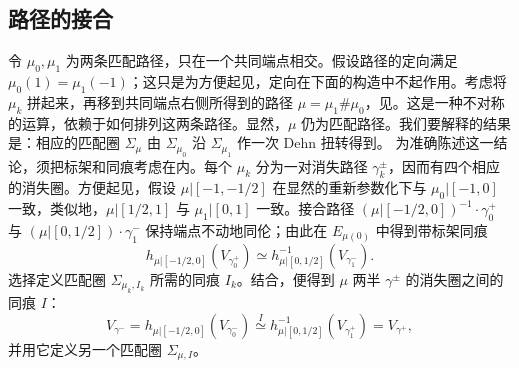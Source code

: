 \subsection{路径的接合}\label{sec:16h}
令 $\mu_0,\mu_1$ 为两条匹配路径，只在一个共同端点相交。假设路径的定向满足 $\mu_0(1)=\mu_1(-1)$；这只是为方便起见，定向在下面的构造中不起作用。考虑将 $\mu_k$ 拼起来，再移到共同端点右侧所得到的路径 $\mu=\mu_1\#\mu_0$，见。这是一种不对称的运算，依赖于如何排列这两条路径。显然，$\mu$ 仍为匹配路径。我们要解释的结果是：相应的匹配圈 $\Sigma_\mu$ 由 $\Sigma_{\mu_0}$ 沿 $\Sigma_{\mu_1}$ 作一次 Dehn 扭转得到。
为准确陈述这一结论，须把标架和同痕考虑在内。每个 $\mu_k$ 分为一对消失路径 $\gamma_k^\pm$，因而有四个相应的消失圈。方便起见，假设 $\mu|[-1,-1/2]$ 在显然的重新参数化下与 $\mu_0|[-1,0]$ 一致，类似地，$\mu|[1/2,1]$ 与 $\mu_1|[0,1]$ 一致。接合路径 $(\mu|[-1/2,0])^{-1}\cdot\gamma_0^+$ 与 $(\mu|[0,1/2])\cdot\gamma_1^-$ 保持端点不动地同伦；由此在 $E_{\mu(0)}$ 中得到带标架同痕
\begin{equation}\label{eq:16.9}
h_{\mu|[-1/2,0]}(V_{\gamma_0^+})\simeq
h_{\mu|[0,1/2]}^{-1}(V_{\gamma_1^-}).
\end{equation}
选择定义匹配圈 $\Sigma_{\mu_k,I_k}$ 所需的同痕 $I_k$。结合，便得到 $\mu$ 两半 $\gamma^\pm$ 的消失圈之间的同痕 $I$：
\[
V_{\gamma^-}=h_{\mu|[-1/2,0]}(V_{\gamma_0^-})
\overset I\simeq h_{\mu|[0,1/2]}^{-1}(V_{\gamma_1^+})=V_{\gamma^+},
\]
并用它定义另一个匹配圈 $\Sigma_{\mu,I}$。

